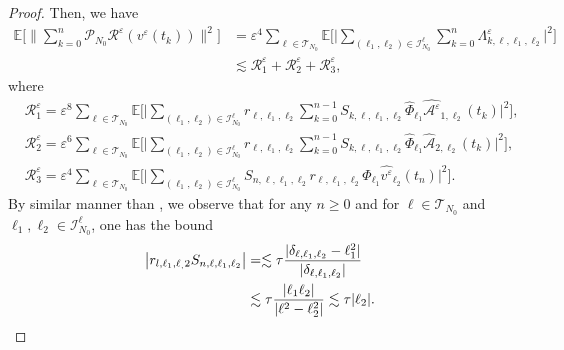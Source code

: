 \documentclass[a4paper]{amsart}
\begin{document}
\begin{proof}

Then, we have
\begin{align*}
\mathbb{E}\big[\|\sum_{k=0}^{n}\mathcal{P}_{N_0}\mathcal{R}^\varepsilon(v^\varepsilon(t_k))\|^2\big]&= \varepsilon^4 \sum_{\ell \in \mathcal{T}_{N_0}}\mathbb{E}\big[\big|\sum_{(\ell_1,\ell_2)\in\mathcal{I}_{N_0}^{\ell}} \sum_{k=0}^n\Lambda^\varepsilon_{k,\ell,\ell_1,\ell_2}\big|^2\big]\\
&\lesssim \mathcal{R}^\varepsilon_1+\mathcal{R}^\varepsilon_2+\mathcal{R}^\varepsilon_3,
\end{align*}
where 
\begin{align*}
    &\mathcal{R}^\varepsilon_1=\varepsilon^8 \sum_{\ell\in \mathcal{T}_{N_0}}\mathbb{E}\big[\big|\sum_{(\ell_1,\ell_2)\in\mathcal{I}_{N_0}^\ell}r_{\ell,\ell_1,\ell_2} \sum_{k=0}^{n-1} S_{k,\ell,\ell_1,\ell_2}\hat{\Phi}_{\ell_1}\widehat{\mathcal{A}^\varepsilon}_{1,\ell_2}(t_k)\big|^2\big],\\
    &\mathcal{R}^\varepsilon_2=\varepsilon^6 \sum_{\ell\in \mathcal{T}_{N_0}}\mathbb{E}\big[\big|\sum_{(\ell_1,\ell_2)\in\mathcal{I}_{N_0}^\ell}r_{\ell,\ell_1,\ell_2} \sum_{k=0}^{n-1} S_{k,\ell,\ell_1,\ell_2}\hat{\Phi}_{\ell_1}\mathcal{\hat{A}}_{2,\ell_2}(t_k)\big|^2\big],\\
    &\mathcal{R}^\varepsilon_3=\varepsilon^4 \sum_{\ell\in \mathcal{T}_{N_0}}\mathbb{E}\big[\big|\sum_{(\ell_1,\ell_2)\in\mathcal{I}_{N_0}^\ell}
    S_{n,\ell,\ell_1,\ell_2}r_{\ell,\ell_1,\ell_2} \hat{\Phi}_{\ell_1}\widehat{v^\varepsilon}_{\ell_2}(t_n)\big|^2\big].
\end{align*}
By similar manner than \cite{fe_ka}, we observe that for any $n\ge 0$ and for $\ell\in\mathcal{T}_{N_0}$ and $\ell_1,\ell_2 \in \mathcal{I}_{N_0}^{\ell}$, one has the bound
\begin{align}
\big|r_{l,\ell_1,\ell_,2} S_{n,\ell,\ell_1,\ell_2}\big|& =\lesssim \tau \frac{|\delta_{\ell,\ell_1,\ell_2}-\ell_1^2|}{|\delta_{\ell,\ell_1,\ell_2}|}\notag \\
&\lesssim \tau \frac{|\ell_1 \ell_2|}{|\ell^2-\ell_2^2|}\lesssim \tau |\ell_2| \label{fe_bound}.

\end{align}
\end{proof}
\end{document}
